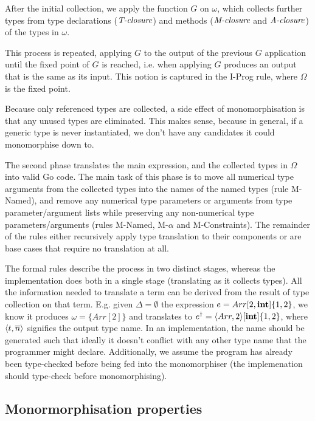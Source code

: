 After the initial collection, we apply the function $G$ on $\omega$, which
collects further types from type declarations ($\textit{T-closure}$) and methods
($\textit{M-closure}$ and $\textit{A-closure}$) of the types in $\omega$.

This process is repeated, applying $G$ to the output of the previous $G$
application until the fixed point of $G$ is reached, i.e. when applying $G$
produces an output that is the same as its input. This notion is captured in the
I-Prog rule, where $\Omega$ is the fixed point.

Because only referenced types are collected, a side effect of monomorphisation
is that any unused types are eliminated. This makes sense, because in general,
if a generic type is never instantiated, we don't have any candidates it could
monomorphise down to.

The second phase translates the main expression, and the collected types in
$\Omega$ into valid Go code. The main task of this phase is to move all
numerical type arguments from the collected types into the names of the named
types (rule M-Named), and remove any numerical type parameters or arguments from
type parameter/argument lists while preserving any non-numerical type
parameters/arguments (rules M-Named, M-$\alpha$ and M-Constraints). The
remainder of the rules either recursively apply type translation to their
components or are base cases that require no translation at all.

The formal rules describe the process in two distinct stages, whereas the
implementation does both in a single stage (translating as it collects types).
All the information needed to translate a term can be derived from the result of
type collection on that term. E.g. given $\Delta = \emptyset$ the expression $e
    = Arr[2, \texttt{\bf int}]\{1, 2\}$, we know it produces $\omega = \{Arr[2]\}$ and
translates to $e^\dagger = \langle Arr, 2 \rangle[\texttt{\bf int}]\{1, 2\}$, where $\langle t,
        \overline{n} \rangle$ signifies the output type name. In an implementation, the name should
be generated such that ideally it doesn't conflict with any other type name that
the programmer might declare. Additionally, we assume the program has already
been type-checked before being fed into the monomorphiser (the implemenation
should type-check before monomorphising).



\subsection{Monormorphisation properties}

